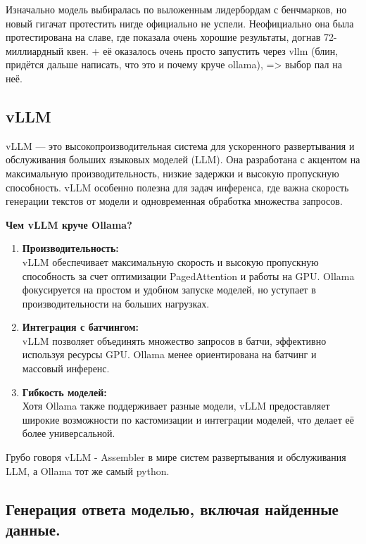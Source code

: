\documentclass{article}
\begin{document}
Изначально модель выбиралась по выложенным лидербордам с бенчмарков, но новый гигачат протестить нигде официально не успели. Неофициально она была протестирована на славе, где показала очень хорошие результаты, догнав 72-миллиардный квен. + её оказалось очень просто запустить через vllm (блин, придётся дальше написать, что это и почему круче ollama), => выбор пал на неё. 

\subsection*{vLLM}

vLLM — это высокопроизводительная система для ускоренного развертывания и обслуживания больших языковых моделей (LLM). Она разработана с акцентом на максимальную производительность, низкие задержки и высокую пропускную способность. vLLM особенно полезна для задач инференса, где важна скорость генерации текстов от модели и одновременная обработка множества запросов.

\textbf{Чем vLLM круче Ollama?}
\begin{enumerate}
    \item \textbf{Производительность:} \\
    vLLM обеспечивает максимальную скорость и высокую пропускную способность за счет оптимизации PagedAttention и работы на GPU. Ollama фокусируется на простом и удобном запуске моделей, но уступает в производительности на больших нагрузках.

    \item \textbf{Интеграция с батчингом:} \\
    vLLM позволяет объединять множество запросов в батчи, эффективно используя ресурсы GPU. Ollama менее ориентирована на батчинг и массовый инференс.

    \item \textbf{Гибкость моделей:} \\
    Хотя Ollama также поддерживает разные модели, vLLM предоставляет широкие возможности по кастомизации и интеграции моделей, что делает её более универсальной.
\end{enumerate}

Грубо говоря vLLM - Assembler в мире систем развертывания и обслуживания LLM, а Ollama тот же самый python.


\subsection{Генерация ответа моделью, включая найденные данные.}
\end{document}
